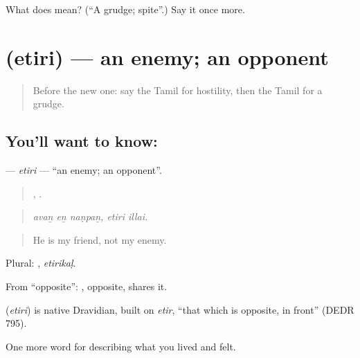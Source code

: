 \begin{tcolorbox}[breakable,colback=teal!4,colframe=teal!35!black,title={Before you move on}]
What does  mean? (\textquotedblleft{}A grudge; spite\textquotedblright{}.) Say it once more.
\end{tcolorbox}
\section[\texorpdfstring{\ta{எதிரி} (etiri)}{எதிரி (etiri)}]{ (etiri) — an enemy; an opponent}

\label{lesson:TA-C469-etiri}



\begin{quote}
Before the new one: say the Tamil for hostility, then the Tamil for a grudge.
\end{quote}

\subsection*{You'll want to know: }
\textbf{} — \emph{etiri} — \textquotedblleft{}an enemy; an opponent\textquotedblright{}.

\begin{quote}
  ,  .
\end{quote}

\begin{quote}
\emph{avaṉ eṉ naṇpaṉ, etiri illai.}
\end{quote}

\begin{quote}
He is my friend, not my enemy.
\end{quote}

Plural: , \emph{etirikaḷ}.

From  \textquotedblleft{}opposite\textquotedblright{}: , opposite, shares it.

\begin{cousinweb}
\textbf{} (\emph{etiri}) is native Dravidian, built on  \emph{etir}, \textquotedblleft{}that which is opposite, in front\textquotedblright{} (DEDR 795).
\end{cousinweb}

\begin{grammarlens}[title={What you've built}]
One more word for describing what you lived and felt.
\end{grammarlens}

